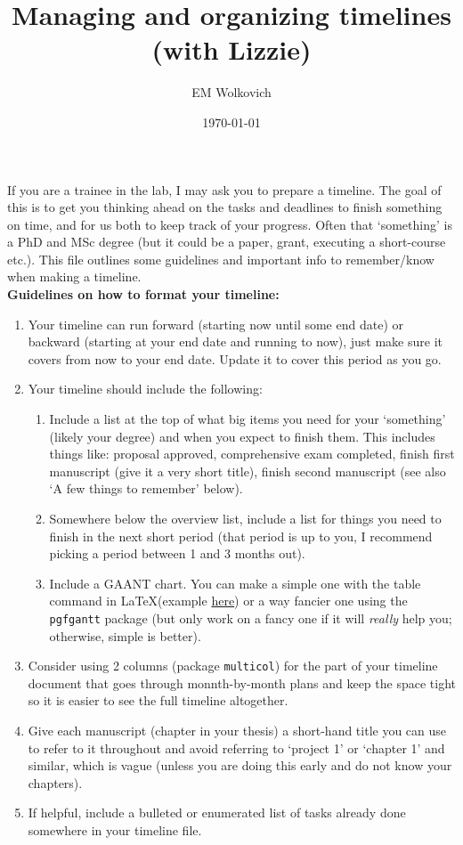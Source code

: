 \documentclass[11pt,letter]{article}
\title{Managing and organizing timelines (with Lizzie)}
\author{EM Wolkovich}
\date{\today}
\begin{document}
\maketitle

If you are a trainee in the lab, I may ask you to prepare a timeline. The goal of this is to get you thinking ahead on the tasks and deadlines to finish something on time, and for us both to keep track of your progress. Often that `something' is a PhD and MSc degree (but it could be a paper, grant, executing a short-course etc.). This file outlines some guidelines and important info to remember/know when making a timeline.\\

{\bf Guidelines on how to format your timeline:}
\begin{enumerate}
\item Your timeline can run forward (starting now until some end date) or backward (starting at your end date and running to now), just make sure it covers from now to your end date.  Update it to cover this period as you go. 
\item Your timeline should include the following:
\begin{enumerate}
\item Include a list at the top of what big items you need for your `something' (likely your degree) and when you expect to finish them. This includes things like: proposal approved, comprehensive exam completed, finish first manuscript (give it a very short title), finish second manuscript (see also `A few things to remember' below). 
\item Somewhere below the overview list, include a list for things you need to finish in the next short period (that period is up to you, I recommend picking a period between 1 and 3 months out). 
\item Include a GAANT chart. You can make a simple one with the table command in \LaTeX (example \href{https://www.mjr19.org.uk/IT/gantt_latex.html}{here}) or a way fancier one using the \verb|pgfgantt| package (but only work on a fancy one if it will \emph{really} help you; otherwise, simple is better). 
\end{enumerate}
\item Consider using 2 columns (package \verb|multicol|) for the part of your timeline document that goes through monnth-by-month plans and keep the space tight so it is easier to see the full timeline altogether. 
\item Give each manuscript (chapter in your thesis) a short-hand title you can use to refer to it throughout and avoid referring to `project 1' or `chapter 1' and similar, which is vague (unless you are doing this early and do not know your chapters). 
\item If helpful, include a bulleted or enumerated list of tasks already done somewhere in your timeline file. 
\end{enumerate}
\end{document}
